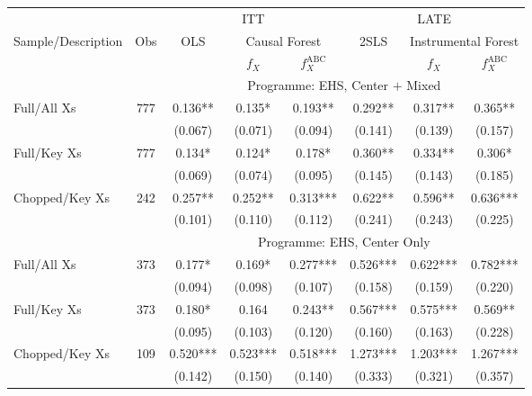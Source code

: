 \begin{tabular}{lccccccc}
\toprule 
\midrule 
\multicolumn{2}{c}{} & \multicolumn{3}{c}{ITT} & \multicolumn{3}{c}{LATE} \\
 \cmidrule(lr){3-5} \cmidrule(lr){6-8} 
Sample/Description & Obs & OLS & \multicolumn{2}{c}{Causal Forest} & 2SLS & \multicolumn{2}{c}{Instrumental Forest} \\
\multicolumn{3}{c}{} & $f_X$ & $f_X^{\text{ABC}}$ &  & $f_X$ & $f_X^{\text{ABC}}$ \\
\midrule 
 &  & \multicolumn{6}{c}{Programme: EHS, Center $+$ Mixed} \\
 \cmidrule(lr){3-8} 
Full/All Xs & 777 & 0.136** & 0.135* & 0.193** & 0.292** & 0.317** & 0.365** \\
 &  & (0.067) & (0.071) & (0.094) & (0.141) & (0.139) & (0.157) \\
Full/Key Xs & 777 & 0.134* & 0.124* & 0.178* & 0.360** & 0.334** & 0.306* \\
 &  & (0.069) & (0.074) & (0.095) & (0.145) & (0.143) & (0.185) \\
Chopped/Key Xs & 242 & 0.257** & 0.252** & 0.313*** & 0.622** & 0.596** & 0.636*** \\
 &  & (0.101) & (0.110) & (0.112) & (0.241) & (0.243) & (0.225) \\
\midrule 
 &  & \multicolumn{6}{c}{Programme: EHS, Center Only} \\
 \cmidrule(lr){3-8} 
Full/All Xs & 373 & 0.177* & 0.169* & 0.277*** & 0.526*** & 0.622*** & 0.782*** \\
 &  & (0.094) & (0.098) & (0.107) & (0.158) & (0.159) & (0.220) \\
Full/Key Xs & 373 & 0.180* & 0.164 & 0.243** & 0.567*** & 0.575*** & 0.569** \\
 &  & (0.095) & (0.103) & (0.120) & (0.160) & (0.163) & (0.228) \\
Chopped/Key Xs & 109 & 0.520*** & 0.523*** & 0.518*** & 1.273*** & 1.203*** & 1.267*** \\
 &  & (0.142) & (0.150) & (0.140) & (0.333) & (0.321) & (0.357) \\
\midrule 
\bottomrule 
\end{tabular}
